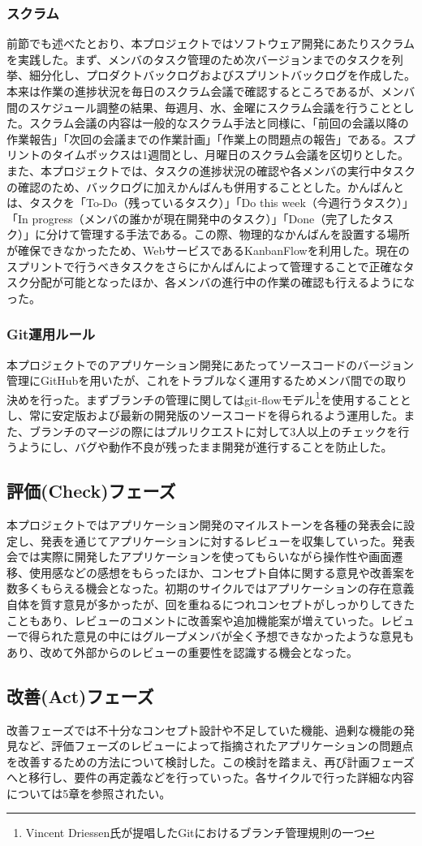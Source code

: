 \subsubsection{スクラム}
前節でも述べたとおり、本プロジェクトではソフトウェア開発にあたりスクラムを実践した。まず、メンバのタスク管理のため次バージョンまでのタスクを列挙、細分化し、プロダクトバックログおよびスプリントバックログを作成した。本来は作業の進捗状況を毎日のスクラム会議で確認するところであるが、メンバ間のスケジュール調整の結果、毎週月、水、金曜にスクラム会議を行うこととした。スクラム会議の内容は一般的なスクラム手法と同様に、「前回の会議以降の作業報告」「次回の会議までの作業計画」「作業上の問題点の報告」である。スプリントのタイムボックスは1週間とし、月曜日のスクラム会議を区切りとした。また、本プロジェクトでは、タスクの進捗状況の確認や各メンバの実行中タスクの確認のため、バックログに加えかんばんも併用することとした。かんばんとは、タスクを「To-Do（残っているタスク）」「Do this week（今週行うタスク）」「In progress（メンバの誰かが現在開発中のタスク）」「Done（完了したタスク）」に分けて管理する手法である。この際、物理的なかんばんを設置する場所が確保できなかったため、WebサービスであるKanbanFlowを利用した。現在のスプリントで行うべきタスクをさらにかんばんによって管理することで正確なタスク分配が可能となったほか、各メンバの進行中の作業の確認も行えるようになった。
\subsubsection{Git運用ルール}
本プロジェクトでのアプリケーション開発にあたってソースコードのバージョン管理にGitHubを用いたが、これをトラブルなく運用するためメンバ間での取り決めを行った。まずブランチの管理に関してはgit-flowモデル\footnote{Vincent Driessen氏が提唱したGitにおけるブランチ管理規則の一つ}を使用することとし、常に安定版および最新の開発版のソースコードを得られるよう運用した。また、ブランチのマージの際にはプルリクエストに対して3人以上のチェックを行うようにし、バグや動作不良が残ったまま開発が進行することを防止した。
\subsection{評価(Check)フェーズ}
本プロジェクトではアプリケーション開発のマイルストーンを各種の発表会に設定し、発表を通じてアプリケーションに対するレビューを収集していった。発表会では実際に開発したアプリケーションを使ってもらいながら操作性や画面遷移、使用感などの感想をもらったほか、コンセプト自体に関する意見や改善案を数多くもらえる機会となった。初期のサイクルではアプリケーションの存在意義自体を質す意見が多かったが、回を重ねるにつれコンセプトがしっかりしてきたこともあり、レビューのコメントに改善案や追加機能案が増えていった。レビューで得られた意見の中にはグループメンバが全く予想できなかったような意見もあり、改めて外部からのレビューの重要性を認識する機会となった。
\subsection{改善(Act)フェーズ}
改善フェーズでは不十分なコンセプト設計や不足していた機能、過剰な機能の発見など、評価フェーズのレビューによって指摘されたアプリケーションの問題点を改善するための方法について検討した。この検討を踏まえ、再び計画フェーズへと移行し、要件の再定義などを行っていった。各サイクルで行った詳細な内容については5章を参照されたい。

